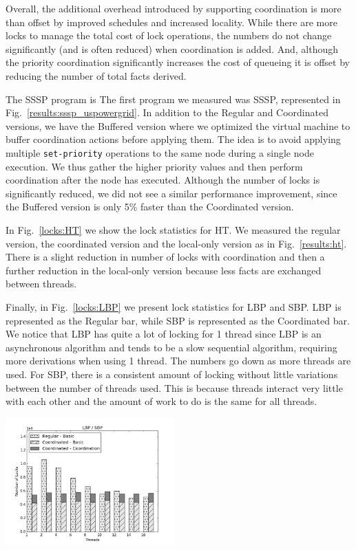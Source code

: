 Overall, the additional overhead introduced by supporting coordination
is more than offset by improved schedules and increased locality.
While there are more locks to manage the total cost of lock operations,
the numbers do not change significantly (and is often reduced) when coordination
is added.  And, although the priority coordination significantly
increases the cost of queueing it is offset by reducing the number of
total facts derived.


\iffalse

  The
SSSP program is The first program we measured was SSSP, represented in
Fig.~\ref{results:sssp_uspowergrid}. In addition to the Regular and
Coordinated versions, we have the Buffered version where we optimized
the virtual machine to buffer coordination actions before applying
them. The idea is to avoid applying multiple \texttt{set-priority}
operations to the same node during a single node execution. We thus
gather the higher priority values and then perform coordination after
the node has executed.  Although the number of locks is significantly
reduced, we did not see a similar performance improvement, since the
Buffered version is only 5\% faster than the Coordinated version.


In Fig.~\ref{locks:HT} we show the lock statistics for HT. We measured the
regular version, the coordinated version and the local-only version as in
Fig.~\ref{results:ht}. There is a slight reduction in number of locks with
coordination and then a further reduction in the local-only version because less
facts are exchanged between threads.

Finally, in Fig.~\ref{locks:LBP} we present lock statistics for LBP and SBP. LBP
is represented as the Regular bar, while SBP is represented as the Coordinated
bar. We notice that LBP has quite a lot of locking for 1 thread since LBP
is an asynchronous algorithm and tends to be a slow sequential algorithm,
requiring more derivations when using 1 thread. The numbers go down as more
threads are used. For SBP, there is a consistent amount of locking without
little variations between the number of threads used. This is because threads
interact very little with each other and the amount of work to do is the same
for all threads.

\begin{topfig}
   \begin{center}
      \includegraphics[width=6.5cm]{results/locks/bp.png}
   \end{center}
\end{topfig}

